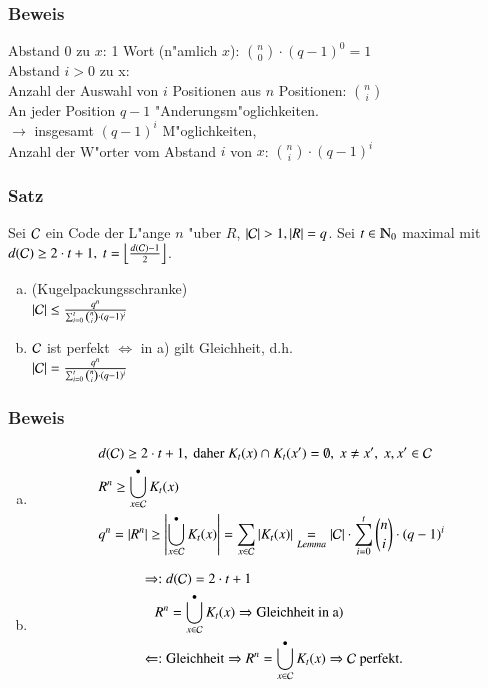 \subsubsection{Beweis}
Abstand 0 zu $x$: 1 Wort (n"amlich $x$): $\binom{n}{0} \cdot (q-1)^0 =1$ \\
Abstand $i>0$ zu x: \\
Anzahl der Auswahl von $i$ Positionen aus $n$ Positionen: $\binom{n}{i}$ \\
An jeder Position $q-1$ "Anderungsm"oglichkeiten. \\
$\rightarrow$ insgesamt $(q-1)^i$ M"oglichkeiten, \\
Anzahl der W"orter vom Abstand $i$ von $x$: $\binom{n}{i} \cdot (q-1)^i$

\subsubsection{Satz}
Sei $\mathcal{C}$ ein Code der L"ange $n$ "uber $R$, $\left| \Code \right|> 1, \left|R\right| = q$. Sei $t \in \N_0$ maximal mit $d(\mathcal{C}) \geq 2 \cdot t + 1,\ t=\left\lfloor \frac{d(\mathcal{C})-1}{2}\right\rfloor$.
\begin{enumerate}[a)]
	\item (Kugelpackungsschranke) \\
	$\left|\mathcal{C}\right| \leq \frac{q^n}{\sum_{i=0}^t \binom{n}{i} \cdot (q-1)^i}$
	\item $\mathcal{C}$ ist perfekt $\Leftrightarrow$ in a) gilt Gleichheit, d.h. \\
	$\left|\mathcal{C}\right| = \frac{q^n}{\sum_{i=0}^t \binom{n}{i} \cdot (q-1)^i}$
\end{enumerate}

\subsubsection{Beweis}
\begin{enumerate}[a)]
	\item \begin{align*}
			&d(\mathcal{C}) \geq 2 \cdot t + 1,\text{ daher }K_t(x) \cap K_t(x')=\emptyset,\ x\neq x',\ x,x' \in \mathcal{C}  \\
			&R^n \geq \bigcup^{\bullet}_{x \in \mathcal{C}} K_t(x) \\
			&q^n=\left|R^n\right| \geq \left| \bigcup^{\bullet}_{x \in \mathcal{C}} K_t(x) \right| = \sum_{x \in \mathcal{C}} \left| K_t(x) \right|
			\underset{Lemma}{=}\left| \mathcal{C} \right| \cdot \sum_{i=0}^t \binom{n}{i} \cdot (q-1)^i\\
		\end{align*}
	\item \begin{align*}
			&\Rightarrow:d(\mathcal{C})=2 \cdot t +1 \\
			&\quad R^n = \bigcup^{\bullet}_{x \in \mathcal{C}} K_t(x) \Rightarrow \text{Gleichheit in a)}\\
			&\Leftarrow: \text{Gleichheit} \Rightarrow R^n=\bigcup^{\bullet}_{x \in \mathcal{C}} K_t(x) \Rightarrow \mathcal{C} \text{ perfekt.}
		\end{align*}
\end{enumerate}
